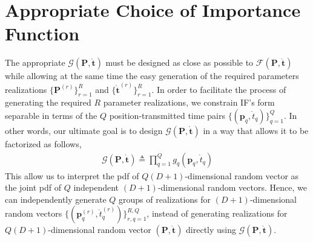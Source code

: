 \documentclass[review]{elsarticle}
\begin{document}
\section{Appropriate Choice of Importance Function}
The appropriate $\mathcal{G}(\boldsymbol{P},\mathring{\boldsymbol{t}})$ must be designed as close as possible to $\mathcal{F}(\boldsymbol{P},\mathring{\boldsymbol{t}})$ while allowing at the same time the easy generation of the required parameters realizations $\lbrace \boldsymbol{P}^{(r)}\rbrace_{r=1}^R$ and $\lbrace \mathring{\boldsymbol{t}}^{(r)}\rbrace_{r=1}^R$. 
In order to facilitate the process of generating the required $R$ parameter realizations, we constrain IF's form separable in terms of the $Q$ position-transmitted time pairs $\lbrace(\boldsymbol{p}_q,\mathring{t}_q)\rbrace_{q=1}^Q$. In other words, our ultimate goal is to design $\mathcal{G}(\boldsymbol{P},\mathring{\boldsymbol{t}})$ in a way that allows it to be factorized as follows,
\begin{align}\label{SForm}
    \mathcal{G}(\boldsymbol{P},\mathring{\boldsymbol{t}})\triangleq \prod_{q=1}^Q g_q(\boldsymbol{p}_q,\mathring{t}_q)
\end{align}
This allow us to interpret the pdf of $Q(D+1)$-dimensional random vector as the joint pdf of $Q$ independent $(D+1)$-dimensional random vectors. Hence, we can independently generate $Q$ groups of realizations for $(D+1)$-dimensional random vectors $\lbrace(\boldsymbol{p}_q^{(r)},\mathring{t}_q^{(r)})\rbrace_{r,q=1}^{R,Q}$, instead of generating realizations for $Q(D+1)$-dimensional random vector $(\boldsymbol{P},\mathring{\boldsymbol{t}})$ directly using $\mathcal{G}(\boldsymbol{P},\mathring{\boldsymbol{t}})$. 
\end{document}
